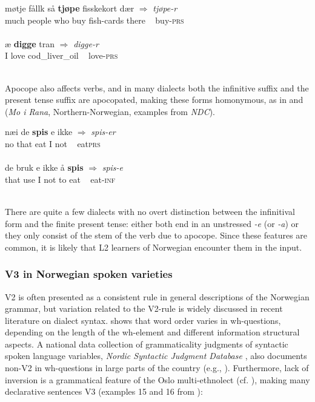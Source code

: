 \documentclass[output=paper,colorlinks,citecolor=brown,modfonts,nonflat]{../langscibook}
\begin{document}
\ea%
    \label{ex:emilsen:11}
\gll møtje fållk så \textbf{tjøpe} fisskekort dær ${\Rightarrow}$ \textit{tjøpe-r}\\
 much people who buy  fish-cards there ~ buy-\textsc{prs}\\
  \\

\ex%
    \label{ex:emilsen:12}
\gll æ \textbf{digge} tran ${\Rightarrow}$ \textit{digge-r}\\
 I love  cod\_liver\_oil ~ love-\textsc{prs}\\
  \\
\z

Apocope also affects verbs, and in many dialects both the infinitive suffix and the present tense suffix are apocopated, making these forms homonymous, as in  and  (\textit{Mo i Rana}, Northern-Norwegian, examples from \textit{NDC}).


\ea%
    \label{ex:emilsen:13}
\gll næi de \textbf{spis} e ikke ${\Rightarrow}$ \textit{spis-er} \\
 no that eat  I not ~ eat\textsc{prs} \\
     \\

\ex%
    \label{ex:emilsen:14}
\gll de bruk e ikke å \textbf{spis} ${\Rightarrow}$ \textit{spis-e}\\
 that use I not to eat ~ eat-\textsc{inf}\\
  \\
\z

There are quite a few dialects with no overt distinction between the infinitival form and the finite present tense: either both end in an unstressed \textit{{}-e} (or \textit{{}-a}) or they only consist of the stem of the verb due to apocope. Since these features are common, it is likely that L2 learners of Norwegian encounter them in the input. 

\subsubsection{V3 in Norwegian spoken varieties}%

V2 is often presented as a consistent rule in general descriptions of the Norwegian grammar, but variation related to the V2-rule is widely discussed in recent literature on dialect syntax. \citet{Westergaard2008} shows that word order varies in wh-questions, depending on the length of the wh-element and different information structural aspects. A national data collection of grammaticality judgments of syntactic spoken language variables, \textit{Nordic Syntactic Judgment Database} \citep{LindstadEtAl2009}, also documents non-V2 in wh-questions in large parts of the country (e.g., \citealt{VangsnesWestergaard2014}). Furthermore, lack of inversion is a grammatical feature of the Oslo multi-ethnolect (cf. \citealt{SvendsenRøyneland2008, OpsahlNistov2010}), making many declarative sentences V3 (examples 15 and 16 from \citealt{OpsahlNistov2010}):
\end{document}

